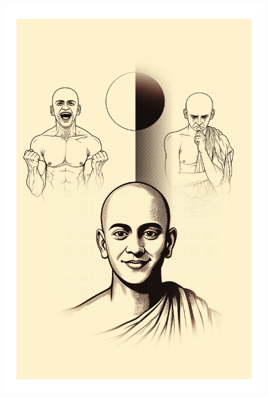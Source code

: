 \clearpage
{} %
\thispagestyle{empty}
\begin{figure}
\centering
\includegraphics[width=\paperwidth, height=\paperheight, keepaspectratio]{./images/003.jpg}
\end{figure}
\restoregeometry %
\newpage

